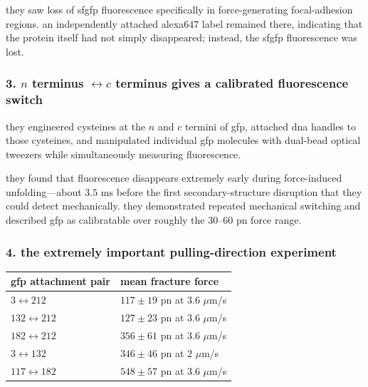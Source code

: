 \documentclass{article}
\begin{document}
they saw loss of sfgfp fluorescence specifically in force-generating focal-adhesion regions. an independently attached alexa\(647\) label remained there, indicating that the protein itself had not simply disappeared; instead, the sfgfp fluorescence was lost. \href{https://pmc.ncbi.nlm.nih.gov/articles/pmc5592801/}{\textbullet}

\subsubsection*{3. \(n\) terminus \(\leftrightarrow c\) terminus gives a calibrated fluorescence switch}

they engineered cysteines at the \(n\) and \(c\) termini of gfp, attached dna handles to those cysteines, and manipulated individual gfp molecules with dual-bead optical tweezers while simultaneously measuring fluorescence. \href{https://www.pnas.org/doi/pdf/10.1073/pnas.1704937114?download=true}{\textbullet}

they found that fluorescence disappears extremely early during force-induced unfolding---about \(3.5\) ms before the first secondary-structure disruption that they could detect mechanically. \href{https://portal.fis.tum.de/en/publications/mechanically-switching-single-molecule-fluorescence-of-gfp-by-unf/}{\textbullet} they demonstrated repeated mechanical switching and described gfp as calibratable over roughly the \(30\)--\(60\) pn force range. \href{https://pmc.ncbi.nlm.nih.gov/articles/pmc5651744/}{\textbullet}

\subsubsection*{4. the extremely important pulling-direction experiment}

\begin{table}[h]\noindent\begin{tabularx}{\linewidth}{ll}
\hline
gfp attachment pair & mean fracture force \\ \hline
\(3 \leftrightarrow 212\) & \(117 \pm 19\) pn at \(3.6\) \(\mu\)m/s \\ \hline
\(132 \leftrightarrow 212\) & \(127 \pm 23\) pn at \(3.6\) \(\mu\)m/s \\ \hline
\(182 \leftrightarrow 212\) & \(356 \pm 61\) pn at \(3.6\) \(\mu\)m/s \\ \hline
\(3 \leftrightarrow 132\) & \(346 \pm 46\) pn at \(2\) \(\mu\)m/s \\ \hline
\(117 \leftrightarrow 182\) & \(548 \pm 57\) pn at \(3.6\) \(\mu\)m/s \\ \hline
\end{tabularx}\end{table}
\end{document}
